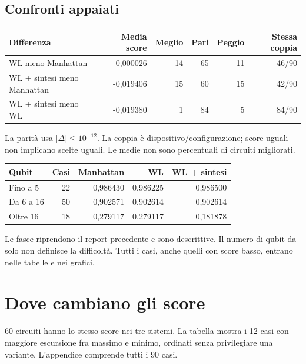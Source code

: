 \documentclass[a4paper,10pt]{article}
\begin{document}
\subsection{Confronti appaiati}\par\medskip\begingroup\small\renewcommand{\arraystretch}{1.18}\setlength{\tabcolsep}{5pt}
\begin{tabularx}{\linewidth}{Xrrrrr}\toprule
Differenza & Media score & Meglio & Pari & Peggio & Stessa coppia\\\midrule
WL meno Manhattan & -0,000026 & 14 & 65 & 11 & 46/90\\
WL + sintesi meno Manhattan & -0,019406 & 15 & 60 & 15 & 42/90\\
WL + sintesi meno WL & -0,019380 & 1 & 84 & 5 & 84/90\\
\bottomrule\end{tabularx}\endgroup\par
La parità usa $|\Delta|\leq10^{-12}$. La coppia è dispositivo/configurazione; score uguali non implicano scelte uguali. Le medie non sono percentuali di circuiti migliorati.\par\par\medskip\begingroup\small\renewcommand{\arraystretch}{1.18}\setlength{\tabcolsep}{5pt}
\begin{tabularx}{\linewidth}{Xrrrr}\toprule
Qubit & Casi & Manhattan & WL & WL + sintesi\\\midrule
Fino a 5 & 22 & 0,986430 & 0,986225 & 0,986500\\
Da 6 a 16 & 50 & 0,902571 & 0,902614 & 0,902614\\
Oltre 16 & 18 & 0,279117 & 0,279117 & 0,181878\\
\bottomrule\end{tabularx}\endgroup\par
Le fasce riprendono il report precedente e sono descrittive.
Il numero di qubit da solo non definisce la difficoltà. Tutti i casi,
anche quelli con score basso, entrano nelle tabelle e nei grafici.
\clearpage\section{Dove cambiano gli score}
60 circuiti hanno lo stesso score nei tre sistemi. La tabella mostra i 12 casi con maggiore escursione fra massimo e minimo, ordinati senza privilegiare una variante. L'appendice comprende tutti i 90 casi.\par\par\medskip\begingroup\small\renewcommand{\arraystretch}{1.18}\setlength{\tabcolsep}{5pt}
\end{document}
